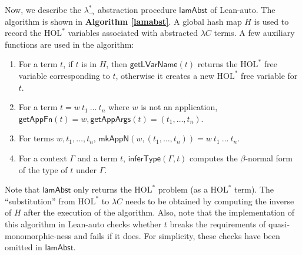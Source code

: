 Now, we describe the $\lambda_\to^*$ abstraction procedure $\mathsf{lamAbst}$ of Lean-auto. The algorithm
is shown in \textbf{Algorithm \ref{lamabst}}. A global hash map $H$ is used to record the $\text{HOL}^*$
variables associated with abstracted $\lambda C$ terms. A few auxiliary functions are used in the algorithm:
\begin{enumerate}
  \item For a term $t$, if $t$ is in $H$, then $\mathsf{getLVarName}(t)$ returns
    the $\text{HOL}^*$ free variable corresponding to $t$, otherwise it creates a new $\text{HOL}^*$ free variable for $t$.
  \item For a term $t = w \ t_1 \ \dots \ t_n$ where $w$ is not an application,
    $\mathsf{getAppFn}(t) = w, \mathsf{getAppArgs}(t) = (t_1, \dots, t_n)$.
  \item For terms $w, t_1, \dots, t_n$, $\mathsf{mkAppN}(w, (t_1, \dots, t_n)) = w \ t_1 \ \dots \ t_n$.
  \item For a context $\Gamma$ and a term $t$, $\mathsf{inferType}(\Gamma, t)$ computes the
    $\beta$-normal form of the type of $t$ under $\Gamma$.
\end{enumerate}
Note that $\mathsf{lamAbst}$ only returns the $\text{HOL}^*$ problem (as a $\text{HOL}^*$ term). The
``substitution'' from $\text{HOL}^*$ to $\lambda C$ needs to be obtained by computing the inverse of $H$ after
the execution of the algorithm. Also, note that the implementation of this algorithm in Lean-auto checks
whether $t$ breaks the requirements of quasi-monomorphic-ness and fails if it
does. For simplicity, these checks have been omitted in $\mathsf{lamAbst}$.

